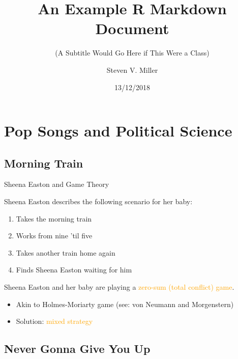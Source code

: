 \documentclass[10pt,ignorenonframetext,]{beamer}
\title{An Example R Markdown Document}
\subtitle{(A Subtitle Would Go Here if This Were a Class)}
\author{Steven V. Miller}
\date{13/12/2018}
\providecommand{\tightlist}{%
  \setlength{\itemsep}{0pt}\setlength{\parskip}{0pt}}
\begin{document}
\frame{\titlepage}

\hypertarget{pop-songs-and-political-science}{%
\section{Pop Songs and Political
Science}\label{pop-songs-and-political-science}}

\hypertarget{morning-train}{%
\subsection{Morning Train}\label{morning-train}}

\begin{frame}{Sheena Easton and Game Theory}
\protect\hypertarget{sheena-easton-and-game-theory}{}

Sheena Easton describes the following scenario for her baby:

\begin{enumerate}
\tightlist
\item
  Takes the morning train
\item
  Works from nine 'til five
\item
  Takes another train home again
\item
  Finds Sheena Easton waiting for him
\end{enumerate}

\bigskip Sheena Easton and her baby are playing a
\textcolor{orange}{zero-sum (total conflict) game}.

\begin{itemize}
\tightlist
\item
  Akin to Holmes-Moriarty game (see: von Neumann and Morgenstern)
\item
  Solution: \textcolor{orange}{mixed strategy}
\end{itemize}

\end{frame}

\hypertarget{never-gonna-give-you-up}{%
\subsection{Never Gonna Give You Up}\label{never-gonna-give-you-up}}
\end{document}
